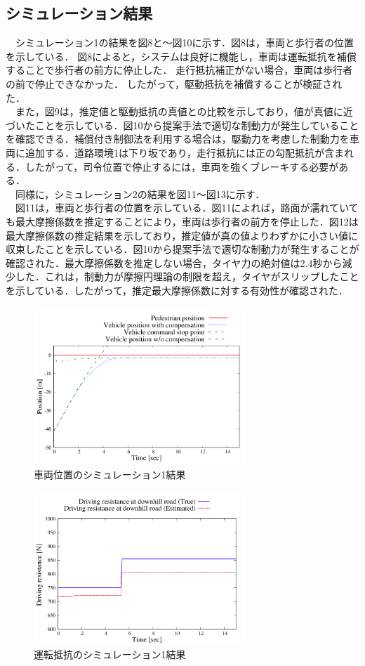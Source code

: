 \subsection{シミュレーション結果}
　シミュレーション1の結果を図8と〜図10に示す．図8は，車両と歩行者の位置を示している． 図8によると，システムは良好に機能し，車両は運転抵抗を補償することで歩行者の前方に停止した． 走行抵抗補正がない場合，車両は歩行者の前で停止できなかった． したがって，駆動抵抗を補償することが検証された．\\
　また，図9は，推定値と駆動抵抗の真値との比較を示しており，値が真値に近づいたことを示している．図10から提案手法で適切な制動力が発生していることを確認できる．補償付き制御法を利用する場合は，駆動力を考慮した制動力を車両に追加する．道路環境1は下り坂であり，走行抵抗には正の勾配抵抗が含まれる．したがって，司令位置で停止するには，車両を強くブレーキする必要がある．\\
　同様に，シミュレーション2の結果を図11〜図13に示す．\\
　図11は，車両と歩行者の位置を示している．図11によれば，路面が濡れていても最大摩擦係数を推定することにより，車両は歩行者の前方を停止した．図12は最大摩擦係数の推定結果を示しており，推定値が真の値よりわずかに小さい値に収束したことを示している．図10から提案手法で適切な制動力が発生することが確認された．最大摩擦係数を推定しない場合，タイヤ力の絶対値は2.4秒から減少した．これは，制動力が摩擦円理論の制限を超え，タイヤがスリップしたことを示している．したがって，推定最大摩擦係数に対する有効性が確認された．
\newpage

\begin{figure}[H]
    \centering
    \includegraphics[width=8cm]{./fig/fig8.png}
    \caption{車両位置のシミュレーション1結果}
\end{figure}

\begin{figure}[H]
    \centering
    \includegraphics[width=8cm]{./fig/fig9.png}
    \caption{運転抵抗のシミュレーション1結果}
\end{figure}

